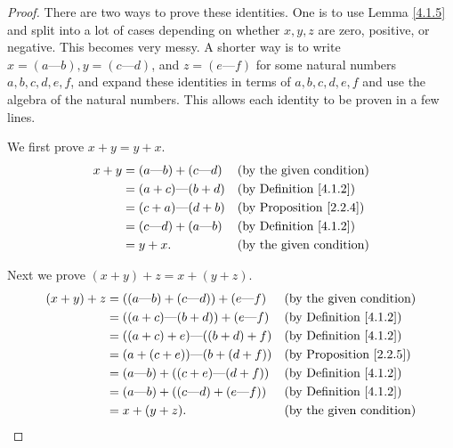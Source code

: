 \begin{proof}
    There are two ways to prove these identities.
    One is to use Lemma \ref{4.1.5} and split into a lot of cases depending on whether \(x, y, z\) are zero, positive, or negative.
    This becomes very messy.
    A shorter way is to write \(x = (a \text{---} b), y = (c \text{---} d)\), and \(z = (e \text{---} f)\) for some natural numbers \(a, b, c, d, e, f\), and expand these identities in terms of \(a, b, c, d, e, f\) and use the algebra of the natural numbers.
    This allows each identity to be proven in a few lines.

    We first prove \(x + y = y + x\).
    \begin{align*}
        x + y & = (a \text{---} b) + (c \text{---} d) &  & \text{(by the given condition)}     \\
              & = (a + c) \text{---} (b + d)          &  & \text{(by Definition \ref{4.1.2})}  \\
              & = (c + a) \text{---} (d + b)          &  & \text{(by Proposition \ref{2.2.4})} \\
              & = (c \text{---} d) + (a \text{---} b) &  & \text{(by Definition \ref{4.1.2})}  \\
              & = y + x.                              &  & \text{(by the given condition)}
    \end{align*}

    Next we prove \((x + y) + z = x + (y + z)\).
    \begin{align*}
        (x + y) + z & = ((a \text{---} b) + (c \text{---} d)) + (e \text{---} f) &  & \text{(by the given condition)}     \\
                    & = ((a + c) \text{---} (b + d)) + (e \text{---} f)          &  & \text{(by Definition \ref{4.1.2})}  \\
                    & = ((a + c) + e) \text{---} ((b + d) + f)                   &  & \text{(by Definition \ref{4.1.2})}  \\
                    & = (a + (c + e)) \text{---} (b + (d + f))                   &  & \text{(by Proposition \ref{2.2.5})} \\
                    & = (a \text{---} b) + ((c + e) \text{---} (d + f))          &  & \text{(by Definition \ref{4.1.2})}  \\
                    & = (a \text{---} b) + ((c \text{---} d) + (e \text{---} f)) &  & \text{(by Definition \ref{4.1.2})}  \\
                    & = x + (y + z).                                             &  & \text{(by the given condition)}
    \end{align*}


\end{proof}
